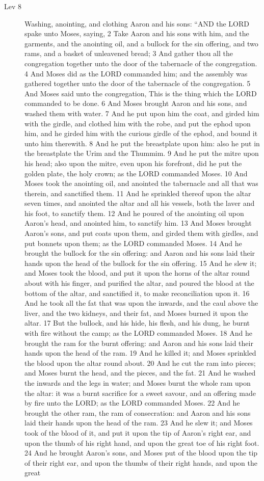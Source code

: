 \begin{description}
		\item[Lev 8] Washing, anointing, and clothing Aaron and his sons: ``AND the LORD spake unto Moses, saying, 2 Take Aaron and his sons with him, and the garments, and the anointing oil, and a bullock for the sin offering, and two rams, and a basket of unleavened bread; 3 And gather thou all the congregation together unto the door of the tabernacle of the congregation. 4 And Moses did as the LORD commanded him; and the assembly was gathered together unto the door of the tabernacle of the congregation. 5 And Moses said unto the congregation, This is the thing which the LORD commanded to be done. 6 And Moses brought Aaron and his sons, and washed them with water. 7 And he put upon him the coat, and girded him with the girdle, and clothed him with the robe, and put the ephod upon him, and he girded him with the curious girdle of the ephod, and bound it unto him therewith. 8 And he put the breastplate upon him: also he put in the breastplate the Urim and the Thummim. 9 And he put the mitre upon his head; also upon the mitre, even upon his forefront, did he put the golden plate, the holy crown; as the LORD commanded Moses. 10 And Moses took the anointing oil, and anointed the tabernacle and all that was therein, and sanctified them. 11 And he sprinkled thereof upon the altar seven times, and anointed the altar and all his vessels, both the laver and his foot, to sanctify them. 12 And he poured of the anointing oil upon Aaron's head, and anointed him, to sanctify him. 13 And Moses brought Aaron's sons, and put coats upon them, and girded them with girdles, and put bonnets upon them; as the LORD commanded Moses. 14 And he brought the bullock for the sin offering: and Aaron and his sons laid their hands upon the head of the bullock for the sin offering. 15 And he slew it; and Moses took the blood, and put it upon the horns of the altar round about with his finger, and purified the altar, and poured the blood at the bottom of the altar, and sanctified it, to make reconciliation upon it. 16 And he took all the fat that was upon the inwards, and the caul above the liver, and the two kidneys, and their fat, and Moses burned it upon the altar. 17 But the bullock, and his hide, his flesh, and his dung, he burnt with fire without the camp; as the LORD commanded Moses. 18 And he brought the ram for the burnt offering: and Aaron and his sons laid their hands upon the head of the ram. 19 And he killed it; and Moses sprinkled the blood upon the altar round about. 20 And he cut the ram into pieces; and Moses burnt the head, and the pieces, and the fat. 21 And he washed the inwards and the legs in water; and Moses burnt the whole ram upon the altar: it was a burnt sacrifice for a sweet savour, and an offering made by fire unto the LORD; as the LORD commanded Moses. 22 And he brought the other ram, the ram of consecration: and Aaron and his sons laid their hands upon the head of the ram. 23 And he slew it; and Moses took of the blood of it, and put it upon the tip of Aaron's right ear, and upon the thumb of his right hand, and upon the great toe of his right foot. 24 And he brought Aaron's sons, and Moses put of the blood upon the tip of their right ear, and upon the thumbs of their right hands, and upon the great 
\end{description}
